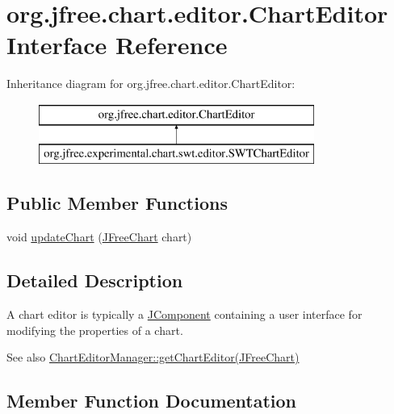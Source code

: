 \hypertarget{interfaceorg_1_1jfree_1_1chart_1_1editor_1_1_chart_editor}{}\section{org.\+jfree.\+chart.\+editor.\+Chart\+Editor Interface Reference}
\label{interfaceorg_1_1jfree_1_1chart_1_1editor_1_1_chart_editor}
Inheritance diagram for org.\+jfree.\+chart.\+editor.\+Chart\+Editor\+:\begin{figure}[H]
\begin{center}
\leavevmode
\includegraphics[height=2.000000cm]{interfaceorg_1_1jfree_1_1chart_1_1editor_1_1_chart_editor}
\end{center}
\end{figure}
\subsection*{Public Member Functions}
\begin{DoxyCompactItemize}
\item 
void \mbox{\hyperlink{interfaceorg_1_1jfree_1_1chart_1_1editor_1_1_chart_editor_a24deeea10b651d5ddc2aed864d00b3b9}{update\+Chart}} (\mbox{\hyperlink{classorg_1_1jfree_1_1chart_1_1_j_free_chart}{J\+Free\+Chart}} chart)
\end{DoxyCompactItemize}


\subsection{Detailed Description}
A chart editor is typically a \mbox{\hyperlink{}{J\+Component}} containing a user interface for modifying the properties of a chart.

\begin{DoxySeeAlso}{See also}
\mbox{\hyperlink{classorg_1_1jfree_1_1chart_1_1editor_1_1_chart_editor_manager_a3d910d06da2e0dd6877fa46d876a44f4}{Chart\+Editor\+Manager\+::get\+Chart\+Editor(\+J\+Free\+Chart)}} 
\end{DoxySeeAlso}


\subsection{Member Function Documentation}
\mbox{\label{interfaceorg_1_1jfree_1_1chart_1_1editor_1_1_chart_editor_a24deeea10b651d5ddc2aed864d00b3b9}} 
